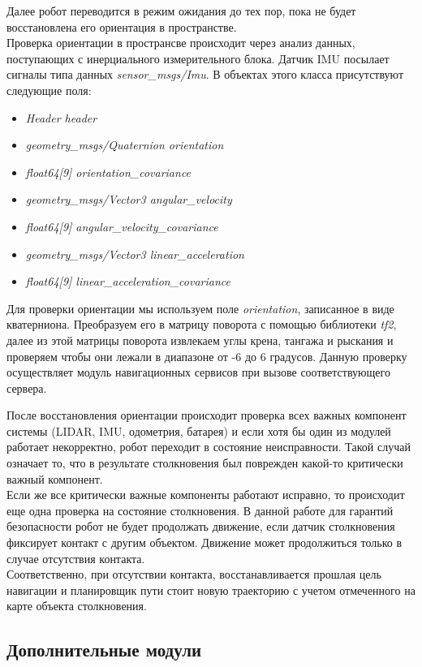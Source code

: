 Далее робот переводится в режим ожидания до тех пор, пока не будет восстановлена его ориентация в пространстве. \\ 
Проверка ориентации в пространсве происходит через анализ данных, поступающих с инерциального измерительного блока. Датчик IMU посылает сигналы типа данных \textit{sensor\_msgs/Imu}. В объектах этого класса присутствуют следующие поля:
\begin{itemize}
    \item \textit{Header header}
    \item \textit{geometry\_msgs/Quaternion orientation}
    \item \textit{float64[9] orientation\_covariance}
    \item \textit{geometry\_msgs/Vector3 angular\_velocity}
    \item \textit{float64[9] angular\_velocity\_covariance}
    \item \textit{geometry\_msgs/Vector3 linear\_acceleration}
    \item \textit{float64[9] linear\_acceleration\_covariance}
\end{itemize}

Для проверки ориентации мы используем поле \textit{orientation}, записанное в виде кватерниона. Преобразуем его в матрицу поворота с помощью библиотеки \textit{tf2}, далее из этой матрицы поворота извлекаем углы крена, тангажа и рыскания и проверяем чтобы они лежали в диапазоне от -6 до 6 градусов. Данную проверку осуществляет модуль навигационных сервисов при вызове соответствующего сервера.

После восстановления ориентации происходит проверка всех важных компонент системы (LIDAR, IMU, одометрия, батарея) и если хотя бы один из модулей работает некорректно, робот переходит в состояние неисправности. Такой случай означает то, что в результате столкновения был поврежден какой-то критически важный компонент. \\
Если же все критически важные компоненты работают исправно, то происходит еще одна проверка на состояние столкновения. В данной работе для гарантий безопасности робот не будет продолжать движение, если датчик столкновения фиксирует контакт с другим объектом. Движение может продолжиться только в случае отсутствия контакта. \\ 
Соответственно, при отсутствии контакта, восстанавливается прошлая цель навигации и планировщик пути стоит новую траекторию с учетом отмеченного на карте объекта столкновения.

\subsection{Дополнительные модули}

